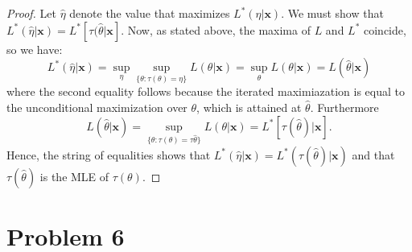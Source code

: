 \documentclass[twoside,11pt]{homework}
\begin{document}
\begin{proof}[Proof]
Let $\hat{\eta}$ denote the value that maximizes $L^*(\eta | \textbf{x})$. We must show that $L^*(\hat{\eta} | \textbf{x})=L^*[\tau(\hat{\theta} | \textbf{x}]$.
Now, as stated above, the maxima of $L$ and $L^*$ coincide, so we have:
\[ L^*(\hat{\eta} | \textbf{x})=\sup_{\eta}\sup_{\{\theta :\tau (\theta)=\eta\}}L(\theta | \textbf{x})=\sup_{\theta} L(\theta | \textbf{x})=L(\hat{\theta} | \textbf{x}) \]
where the second equality follows because the iterated maximiazation is equal to the unconditional maximization over $\theta$, which is attained at $\hat{\theta}$. Furthermore
\[ L(\hat{\theta} | \textbf{x}) = \sup_{\{\theta :\tau (\theta)=\tau{\hat{\theta}}\}} L(\theta | \textbf{x}) = L^*[\tau(\hat{\theta}) | \textbf{x}]. \]
Hence, the string of equalities shows that $L^*(\hat{\eta} | \textbf{x}) = L^*(\tau(\hat{\theta}) | \textbf{x})$ and that $\tau(\hat{\theta})$ is the MLE of $\tau(\theta)$.
\end{proof}



\section*{Problem 6}
\end{document}
